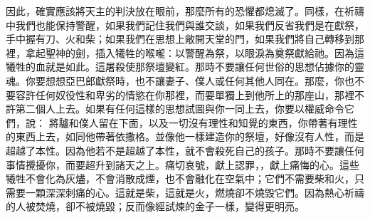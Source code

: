 因此，確實應該將天主的判決放在眼前，那麼所有的恐懼都熄滅了。同樣，在祈禱中我們也能保持警醒，如果我們記住我們與誰交談，如果我們反省我們是在獻祭，手中握有刀、火和柴；如果我們在思想上敞開天堂的門，如果我們將自己轉移到那裡，拿起聖神的劍，插入犧牲的喉嚨：以警醒為祭，以眼淚為奠祭獻給祂。因為這犧牲的血就是如此。這屠殺使那祭壇變紅。那時不要讓任何世俗的思想佔據你的靈魂。你要想想亞巴郎獻祭時，也不讓妻子、僕人或任何其他人同在。那麼，你也不要容許任何奴役性和卑劣的情慾在你那裡，而要單獨上到他所上的那座山，那裡不許第二個人上去。如果有任何這樣的思想試圖與你一同上去，你要以權威命令它們，說：  將驢和僕人留在下面，以及一切沒有理性和知覺的東西，你帶著有理性的東西上去，如同他帶著依撒格。並像他一樣建造你的祭壇，好像沒有人性，而是超越了本性。因為他若不是超越了本性，就不會殺死自己的孩子。那時不要讓任何事情攪擾你，而要超升到諸天之上。痛切哀號，獻上認罪，，獻上痛悔的心。這些犧牲不會化為灰燼，不會消散成煙，也不會融化在空氣中；它們不需要柴和火，只需要一顆深深刺痛的心。這就是柴，這就是火，燃燒卻不燒毀它們。因為熱心祈禱的人被焚燒，卻不被燒毀；反而像經試煉的金子一樣，變得更明亮。\par

